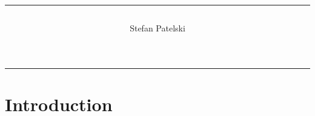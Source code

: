 \documentclass[a4paper,twoside,11pt]{article}
\title{\rule{\linewidth}{.75pt} \center{Title goes here}}
\author{Stefan Patelski}
\begin{document}
\maketitle
\vspace{-2\baselineskip}

\bigskip
\noindent\rule[2.5pt]{\textwidth}{0.75pt}

\newpage

\section{Introduction}


\end{document}
